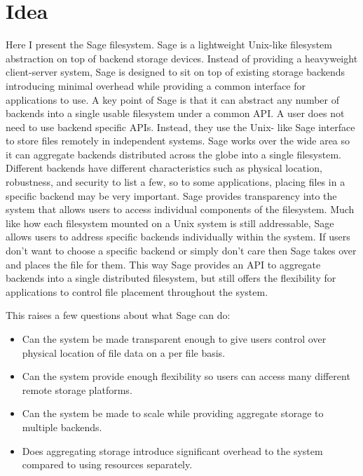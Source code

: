 \section{Idea}

Here I present the Sage filesystem. Sage is a lightweight Unix-like filesystem
abstraction on top of backend storage devices. Instead of providing a
heavyweight client-server system, Sage is designed to sit on top of existing
storage backends introducing minimal overhead while providing a common
interface for applications to use. A key point of Sage is that it can abstract
any number of backends into a single usable filesystem under a common API. A
user does not need to use backend specific APIs. Instead, they use the Unix-
like Sage interface to store files remotely in independent systems. Sage works
over the wide area so it can aggregate backends distributed across the globe
into a single filesystem. Different backends have different characteristics
such as physical location, robustness, and security to list a few, so to some
applications, placing files in a specific backend may be very important. Sage
provides transparency into the system that allows users to access individual
components of the filesystem. Much like how each filesystem mounted on a Unix
system is still addressable, Sage allows users to address specific backends
individually within the system. If users don’t want to choose a specific
backend or simply don’t care then Sage takes over and places the file for
them. This way Sage provides an API to aggregate backends into a single
distributed filesystem, but still offers the flexibility for applications to
control file placement throughout the system.

This raises a few questions about what Sage can do:
\begin{itemize}
\item Can the system be made transparent enough to give users control over physical location of file data on a per file basis.

\item Can the system provide enough flexibility so users can access many different remote storage platforms.

\item Can the system be made to scale while providing aggregate storage to multiple backends.

\item Does aggregating storage introduce significant overhead to the system compared to using resources separately.
\end{itemize}

